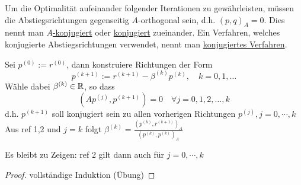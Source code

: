 \begin{bemerkung}[Folgerung]
  Um die Optimalität aufeinander folgender Iterationen zu gewährleisten, müssen die Abstiegsrichtungen gegenseitig $A$-orthogonal sein, d.h. $(p,q)_A=0$. Dies nennt man \underline{$A$-konjugiert} oder \underline{konjugiert} zueinander. Ein Verfahren, welches konjugierte Abstiegsrichtungen verwendet, nennt man \underline{konjugiertes Verfahren}.
\end{bemerkung}

\begin{bemerkung}[vorgehensweise]
  Sei $p^{(0)}:= r^{(0)}$, dann konstruiere Richtungen der Form 
  \begin{equation}
    p^{(k+1)}:=r^{(k+1)}-\beta^{(k)}p^{(k)}, \quad k=0,1,\dots
  \end{equation}
  Wähle dabei $\beta^{(k)} \in \mathbb{R}$, so dass 
  \begin{equation}
    (Ap^{(j)},p^{(k+1)})=0 \quad \forall j=0,1,2,\ldots,k
  \end{equation}
  d.h. $p^{(k+1)}$ soll konjugiert sein zu allen vorherigen Richtungen $p^{(j)}, j=0,\cdots,k$
  Aus ref 1,2 und $j=k$ folgt $\beta^{(k)}=\frac{(p^{(k)},r^{(k+1)})_A}{(p^{(k)},p^{(k)})_A}$
\end{bemerkung}

  Es bleibt zu Zeigen: ref 2 gilt dann auch für $j=0,\cdots,k$
  \begin{proof}
    vollständige Induktion (Übung)
  \end{proof}
